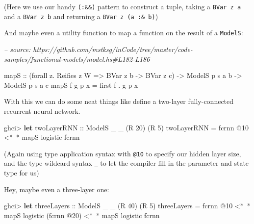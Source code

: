 \documentclass[]{article}
\newenvironment{Shaded}{}{}
\newcommand{\CommentTok}[1]{\textcolor[rgb]{0.38,0.63,0.69}{\textit{#1}}}
\newcommand{\DataTypeTok}[1]{\textcolor[rgb]{0.56,0.13,0.00}{#1}}
\newcommand{\DecValTok}[1]{\textcolor[rgb]{0.25,0.63,0.44}{#1}}
\newcommand{\FunctionTok}[1]{\textcolor[rgb]{0.02,0.16,0.49}{#1}}
\newcommand{\KeywordTok}[1]{\textcolor[rgb]{0.00,0.44,0.13}{\textbf{#1}}}
\newcommand{\NormalTok}[1]{#1}
\newcommand{\OtherTok}[1]{\textcolor[rgb]{0.00,0.44,0.13}{#1}}
\begin{document}
(Here we use our handy \texttt{(:\&\&)} pattern to construct a tuple, taking a
\texttt{BVar\ z\ a} and a \texttt{BVar\ z\ b} and returning a
\texttt{BVar\ z\ (a\ :\&\ b)})

And maybe even a utility function to map a function on the result of a
\texttt{ModelS}:

\begin{Shaded}
\begin{Highlighting}[]
\CommentTok{-- source: https://github.com/mstksg/inCode/tree/master/code-samples/functional-models/model.hs#L182-L186}

\NormalTok{mapS}
\OtherTok{    ::}\NormalTok{ (forall z}\FunctionTok{.} \DataTypeTok{Reifies}\NormalTok{ z }\DataTypeTok{W} \OtherTok{=>} \DataTypeTok{BVar}\NormalTok{ z b }\OtherTok{->} \DataTypeTok{BVar}\NormalTok{ z c)}
    \OtherTok{->} \DataTypeTok{ModelS}\NormalTok{ p s a b}
    \OtherTok{->} \DataTypeTok{ModelS}\NormalTok{ p s a c}
\NormalTok{mapS f g p x }\FunctionTok{=}\NormalTok{ first f }\FunctionTok{.}\NormalTok{ g p x}
\end{Highlighting}
\end{Shaded}

With this we can do some neat things like define a two-layer fully-connected
recurrent neural network.

\begin{Shaded}
\begin{Highlighting}[]
\NormalTok{ghci}\FunctionTok{>} \KeywordTok{let}\OtherTok{ twoLayerRNN ::} \DataTypeTok{ModelS}\NormalTok{ _ _ (}\DataTypeTok{R} \DecValTok{20}\NormalTok{) (}\DataTypeTok{R} \DecValTok{5}\NormalTok{)}
\NormalTok{          twoLayerRNN }\FunctionTok{=}\NormalTok{ fcrnn }\FunctionTok{@}\DecValTok{10} \FunctionTok{<*~*}\NormalTok{ mapS logistic fcrnn}
\end{Highlighting}
\end{Shaded}

(Again using type application syntax with \texttt{@10} to specify our hidden
layer size, and the type wildcard syntax \texttt{\_} to let the compiler fill in
the parameter and state type for us)

Hey, maybe even a three-layer one:

\begin{Shaded}
\begin{Highlighting}[]
\NormalTok{ghci}\FunctionTok{>} \KeywordTok{let}\OtherTok{ threeLayers ::} \DataTypeTok{ModelS}\NormalTok{ _ _ (}\DataTypeTok{R} \DecValTok{40}\NormalTok{) (}\DataTypeTok{R} \DecValTok{5}\NormalTok{)}
\NormalTok{          threeLayers }\FunctionTok{=}\NormalTok{ fcrnn }\FunctionTok{@}\DecValTok{10}
                   \FunctionTok{<*~*}\NormalTok{ mapS logistic (fcrnn }\FunctionTok{@}\DecValTok{20}\NormalTok{)}
                   \FunctionTok{<*~*}\NormalTok{ mapS logistic fcrnn}
\end{Highlighting}
\end{Shaded}
\end{document}
